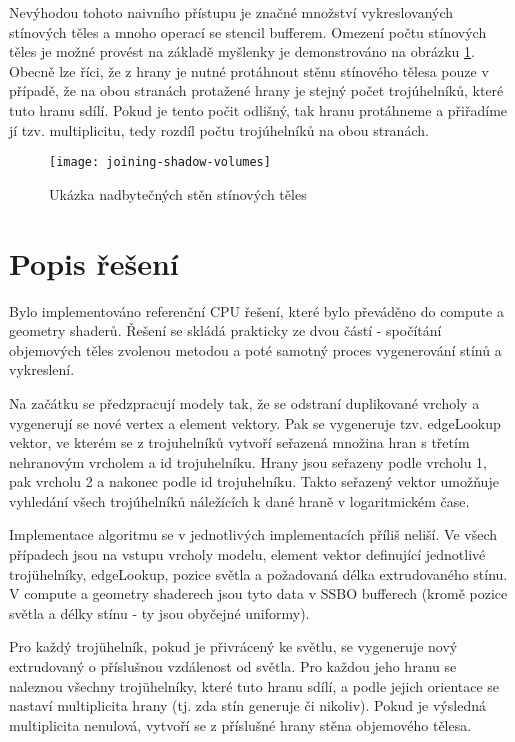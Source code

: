 \documentclass[a4paper, 12pt]{article}
\begin{document}
Nevýhodou tohoto naivního přístupu je značné množství vykreslovaných stínových těles a mnoho operací se stencil bufferem. Omezení počtu stínových těles je možné provést na základě myšlenky je demonstrováno na obrázku \ref{fig:joining-shadow-volumes}. Obecně lze říci, že z hrany je nutné protáhnout stěnu stínového tělesa pouze v případě, že na obou stranách protažené hrany je stejný počet trojúhelníků, které tuto hranu sdílí. Pokud je tento počit odlišný, tak hranu protáhneme a přiřadíme jí tzv. multiplicitu, tedy rozdíl počtu trojúhelníků na obou stranách.

\begin{figure}[H]
	\centering
	\texttt{[image: joining-shadow-volumes]}
	\caption{Ukázka nadbytečných stěn stínových těles}
	\label{fig:joining-shadow-volumes}
\end{figure}



\section{Popis řešení}


Bylo implementováno referenční CPU řešení, které bylo převáděno do compute a geometry shaderů.
Řešení se skládá prakticky ze dvou částí - spočítání objemových těles zvolenou metodou a poté
samotný proces vygenerování stínů a vykreslení.

Na začátku se předzpracují modely tak, že se odstraní duplikované vrcholy a vygenerují se nové
vertex a element vektory. Pak se vygeneruje tzv. edgeLookup vektor, ve kterém se z trojuhelníků 
vytvoří seřazená množina hran s třetím nehranovým vrcholem a id trojuhelníku. Hrany jsou seřazeny
 podle vrcholu 1, pak vrcholu 2 a nakonec podle id trojuhelníku. Takto seřazený vektor umožňuje vyhledání všech trojúhelníků náležících k dané hraně v logaritmickém čase.

Implementace algoritmu se v jednotlivých implementacích příliš neliší. Ve všech případech jsou na
vstupu vrcholy modelu, element vektor definující jednotlivé trojühelníky, edgeLookup, pozice světla a 
požadovaná délka extrudovaného stínu. V compute a geometry shaderech jsou tyto data v SSBO bufferech
(kromě pozice světla a délky stínu - ty jsou obyčejné uniformy).
 
Pro každý trojühelník, pokud je přivrácený ke světlu, se vygeneruje nový extrudovaný o příslušnou vzdálenost
od světla. Pro každou jeho hranu se naleznou všechny trojühelníky, které tuto hranu sdílí, a podle jejich orientace se nastaví multiplicita hrany (tj. zda stín generuje či nikoliv).
Pokud je výsledná multiplicita nenulová, vytvoří se z příslušné hrany stěna objemového tělesa.
\end{document}
